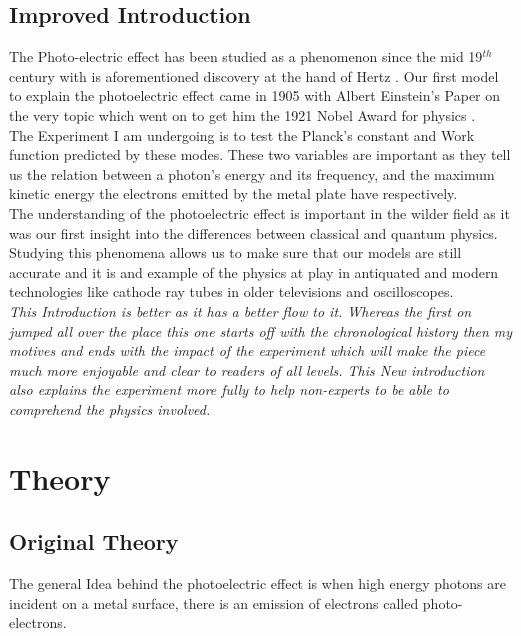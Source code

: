 \documentclass[12pt]{article}
\begin{document}
\subsection{Improved Introduction}
The Photo-electric effect has been studied as a phenomenon since the mid 19$^{th}$ century with is aforementioned discovery at the hand of Hertz \cite{Hertz}. Our first model to explain the photoelectric effect came in 1905 with Albert Einstein's Paper on the very topic which went on to get him the 1921 Nobel Award for physics \cite{1921 Nobel} \cite{Einstein 1905}.\\

The Experiment I am undergoing is to test the Planck's constant and Work function predicted by these modes. These two variables are important as they tell us the relation between a photon's energy and its frequency, and the maximum kinetic energy the electrons emitted by the metal plate have respectively.\\

The understanding of the photoelectric effect is important in the wilder field as it was our first insight into the differences between classical and quantum physics. Studying this phenomena allows us to make sure that our models are still accurate and it is and example of the physics at play in antiquated and modern technologies like cathode ray tubes in older televisions and oscilloscopes.\\

\textit{This Introduction is better as it has a better flow to it. Whereas the first on jumped all over the place this one starts off with the chronological history then my motives and ends with the impact of the experiment which will make the piece much more enjoyable and clear to readers of all levels. This New introduction also explains the experiment more fully to help non-experts to be able to comprehend the physics involved.}

\section{Theory}
\subsection {Original Theory}
The general Idea behind the photoelectric effect is when high energy photons are incident on a metal surface, there is an emission of electrons called photo-electrons.\\
\end{document}
